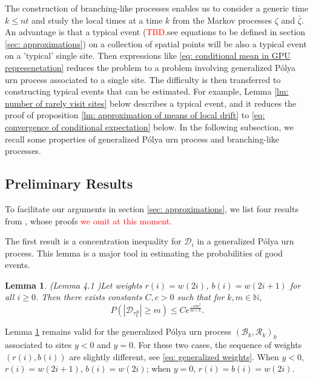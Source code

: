 \documentclass[twoside,12pt,a4paper]{article}
\newtheorem{lemma}{Lemma}[section]
\numberwithin{equation}{section}
\newcommand{\abs}[1]{\left\vert #1 \right\vert}
\newcommand\TBD{\textcolor{red}{TBD.}}
\newcommand{\edt}[1]{\textcolor{red}{#1}} %
\begin{document}
		The construction of branching-like processes enables us to consider a generic time $k\leq nt$ and study the local times at a time $k$ from the Markov processes $\zeta$ and $\bar{\zeta}$. An advantage is that a typical event (\TBD{see equations to be defined in section \ref{sec: approximations}}) on a collection of spatial points will be also a typical event on a 'typical' single site. Then expressions like \eqref{eq: conditional mean in GPU represenetation} reduces the problem to a problem involving generalized P\'{o}lya urn process associated to a single site. The difficulty is then transferred to constructing typical events that can be estimated. For example, Lemma \ref{lm: number of rarely visit sites} below describes a typical event, and it reduces the proof of proposition \ref{lm: approximation of means of local drift} to \eqref{eq: convergence of conditional expectation} below. In the following subsection, we recall some properties of generalized P\'{o}lya urn process and branching-like processes.
		
		\subsection{Preliminary Results}
		To facilitate our arguments in section \ref{sec: approximations}, we list four results from \cite{KMP22,T96}, whose proofs \edt{we omit at this moment.}
		
		The first result is a concentration inequality for $\mathcal{D}_i$ in a generalized P\'{o}lya urn process. This lemma is a major tool in estimating the probabilities of good events.
		\begin{lemma}(Lemma 4.1 \cite{KMP22})\label{lm: concentration inequality}
			Let weights $r(i) = w(2i)$, $b(i)= w(2i+1) $ for all $i\geq 0$. Then there exists constants $C,c>0$ such that for $k, m \in \mathbb{N}$,
			$$
			P\left(  \abs{ \mathcal{D}_{\tau_k^B}   } \geq m \right) \leq C e^{\frac{-cm^2}{m \vee k}}.
			$$
		\end{lemma} 
		Lemma \ref{lm: concentration inequality} remains valid for the generalized P\'{o}lya urn process $(\mathcal{B}_{k},\mathcal{R}_{k})_k$ associated to sites $y<0$ and $y=0$. For these two cases, the sequence of weights $(r(i),b(i))$ are slightly different, see \eqref{eq: generalized weights}. When $y<0$, $r(i) = w(2i+1)$, $b(i)= w(2i) $; when $y=0$, $r(i) = b(i)=w(2i)$.
		
\end{document}
